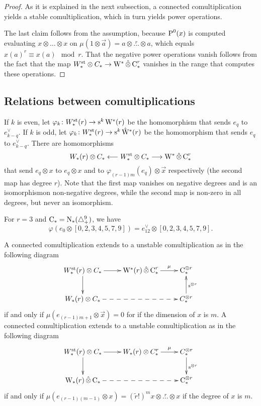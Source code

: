 \begin{proof}
	As it is explained in the next subsection, a connected comultiplication yields a stable comultiplication, which in turn yields power operations. 

	The last claim follows from the assumption, because $\operatorname{P}^0(x)$ is computed evaluating $x\otimes \ldots\otimes x$ on $\mu(1 \otimes \vec{a}) = a\otimes\overset{r}{\ldots}\otimes a$, which equals $x(a)^{r} \equiv x(a) \mod r$. That the negative power operations vanish follows from the fact that the map $W_*^{\mathrm{st}}\otimes C_*\to \mathrm{W}^*\operatorname{\hat{\otimes}} \operatorname{C}_*^r$ vanishes in the range that computes these operations.
\end{proof}

\subsection{Relations between comultiplications}
If $k$ is even, let $\varphi_k\colon W^{\mathrm{st}}_*(r)\to \operatorname{s}^{k}\mathrm{W}^*(r)$ be the homomorphism that sends $e_q$ to $e_{k-q}^{\vee}$. If $k$ is odd, let $\varphi_k\colon W^{\mathrm{st}}_*(r)\to \operatorname{s}^{k}\hat{\mathrm{W}}^*(r)$ be the homomorphism that sends $e_q$ to $e_{k-q}^{\vee}$. There are homomorphisms
\[
W_*(r)\otimes C_* \longleftarrow W^{\mathrm{st}}_*\otimes C_*\longrightarrow \mathrm{W}^*\operatorname{\hat{\otimes}} \operatorname{C}_*^r
\]
that send $e_q\otimes x$ to $e_q\otimes x$ and to $\varphi_{(r-1)m}(e_q)\otimes \vec{x}$ respectively (the second map has degree $r$). Note that the first map vanishes on negative degrees and is an isomorphismon non-negative degrees, while the second map is non-zero in all degrees, but never an isomorphism.

\begin{example}\label{ex:105} For $r=3$ and $\operatorname{C}_*= \operatorname{N}_*(\triangle_{+}^9)$, we have
	\[
	\varphi(e_0\otimes [0,2,3,4,5,7,9]) = e^\vee_{12}\otimes [0,2,3,4,5,7,9].
	\]
\end{example}

A connected comultiplication extends to a unstable comultiplication as in the following diagram
\[
\xymatrix{
	W_*^{\st}(r)\otimes C_*\ar[r]\ar[d] & \rW^*(r)\hotimes \uchains_*^r \ar[r]^-{\mu} & \uchains_*^{\otimes r} \\
	W_*(r)\otimes C_*\ar@{-->}[rr] & & C_*^{\otimes r} \ar[u]_{\sus{\otimes r}}
}
\]
if and only if $\mu(e_{(r-1)m+1}\otimes\vec{x}) = 0$ for if the dimension of $x$ is $m$. A connected comultiplication extends to a unstable comultiplication as in the following diagram
\[
\xymatrix{
	W_*^{\st}(r)\otimes C_*\ar[r]\ar[d] & W_*(r)\otimes C_*^r \ar[r]^-{\mu} & C_*^{\otimes r} \ar[d]^{\sus{\otimes r}} \\
	\rW_*(r)\hotimes \uchains_*\ar@{-->}[rr] & & \uchains_*^{\otimes r}
}
\]
if and only if $\mu(e_{(r-1)(m-1)}\otimes x) = (\tilde{r}!)^mx\otimes \overset{r}{\ldots} \otimes x$ if the degree of $x$ is $m$.%

